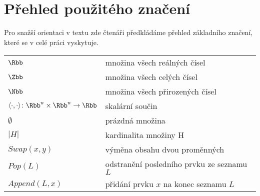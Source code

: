 \chapter*{Přehled použitého značení}

Pro snažší orientaci v textu zde čtenáři předkládáme přehled základního značení, které se v celé práci vyskytuje.
\begin{flushleft}
\begin{longtable}[l]{ll} %
  $\Rbb$                    & množina všech reálných čísel \\[1mm]
  $\Zbb$                    & množina všech celých čísel \\[1mm]
  $\Nbb$                    & množina všech přirozených čísel\\[1mm]
  $ \langle \cdot, \cdot \rangle \colon \Rbb^n \times \Rbb^n \to \Rbb $ & skalární součin \\[1mm]
  $ \emptyset $            & prázdná množina \\[1mm]
  $ |H| $                  & kardinalita množiny H \\[1mm]
  $ Swap(x, y) $           & výměna obsahu dvou proměnných \\[1mm]
  $ Pop(L) $               & odstranění posledního prvku ze seznamu $L$ \\[1mm]
  $ Append(L, x) $         & přidání prvku $x$ na konec seznamu $L$ \\[1mm]
\end{longtable}
\end{flushleft}
